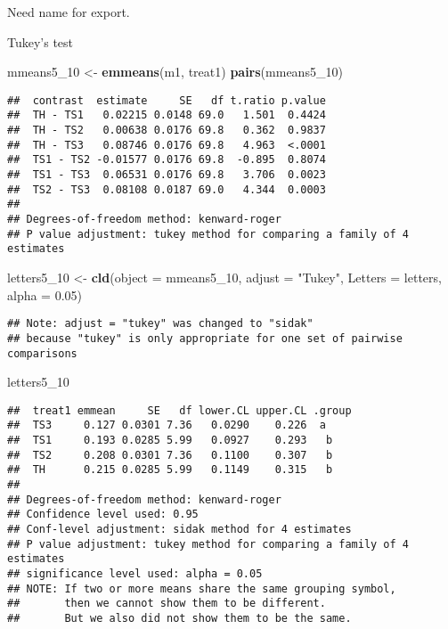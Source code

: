 \documentclass[
]{article}
\newenvironment{Shaded}{\begin{snugshade}}{\end{snugshade}}
\newcommand{\AttributeTok}[1]{\textcolor[rgb]{0.13,0.29,0.53}{#1}}
\newcommand{\FloatTok}[1]{\textcolor[rgb]{0.00,0.00,0.81}{#1}}
\newcommand{\FunctionTok}[1]{\textcolor[rgb]{0.13,0.29,0.53}{\textbf{#1}}}
\newcommand{\NormalTok}[1]{#1}
\newcommand{\OtherTok}[1]{\textcolor[rgb]{0.56,0.35,0.01}{#1}}
\newcommand{\StringTok}[1]{\textcolor[rgb]{0.31,0.60,0.02}{#1}}
\begin{document}
Need name for export.

Tukey's test

\begin{Shaded}
\begin{Highlighting}[]
\NormalTok{mmeans5\_10 }\OtherTok{\textless{}{-}} \FunctionTok{emmeans}\NormalTok{(m1, }\StringTok{\textquotesingle{}treat1\textquotesingle{}}\NormalTok{)}
\FunctionTok{pairs}\NormalTok{(mmeans5\_10)}
\end{Highlighting}
\end{Shaded}

\begin{verbatim}
##  contrast  estimate     SE   df t.ratio p.value
##  TH - TS1   0.02215 0.0148 69.0   1.501  0.4424
##  TH - TS2   0.00638 0.0176 69.8   0.362  0.9837
##  TH - TS3   0.08746 0.0176 69.8   4.963  <.0001
##  TS1 - TS2 -0.01577 0.0176 69.8  -0.895  0.8074
##  TS1 - TS3  0.06531 0.0176 69.8   3.706  0.0023
##  TS2 - TS3  0.08108 0.0187 69.0   4.344  0.0003
## 
## Degrees-of-freedom method: kenward-roger 
## P value adjustment: tukey method for comparing a family of 4 estimates
\end{verbatim}

\begin{Shaded}
\begin{Highlighting}[]
\NormalTok{letters5\_10 }\OtherTok{\textless{}{-}} \FunctionTok{cld}\NormalTok{(}\AttributeTok{object =}\NormalTok{ mmeans5\_10,}
                  \AttributeTok{adjust =} \StringTok{"Tukey"}\NormalTok{,}
                  \AttributeTok{Letters =}\NormalTok{ letters,}
                  \AttributeTok{alpha =} \FloatTok{0.05}\NormalTok{)}
\end{Highlighting}
\end{Shaded}

\begin{verbatim}
## Note: adjust = "tukey" was changed to "sidak"
## because "tukey" is only appropriate for one set of pairwise comparisons
\end{verbatim}

\begin{Shaded}
\begin{Highlighting}[]
\NormalTok{letters5\_10}
\end{Highlighting}
\end{Shaded}

\begin{verbatim}
##  treat1 emmean     SE   df lower.CL upper.CL .group
##  TS3     0.127 0.0301 7.36   0.0290    0.226  a    
##  TS1     0.193 0.0285 5.99   0.0927    0.293   b   
##  TS2     0.208 0.0301 7.36   0.1100    0.307   b   
##  TH      0.215 0.0285 5.99   0.1149    0.315   b   
## 
## Degrees-of-freedom method: kenward-roger 
## Confidence level used: 0.95 
## Conf-level adjustment: sidak method for 4 estimates 
## P value adjustment: tukey method for comparing a family of 4 estimates 
## significance level used: alpha = 0.05 
## NOTE: If two or more means share the same grouping symbol,
##       then we cannot show them to be different.
##       But we also did not show them to be the same.
\end{verbatim}
\end{document}
